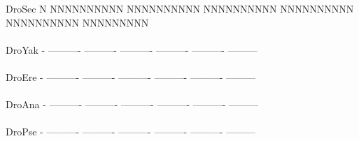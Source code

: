 \documentclass[11pt,twoside,reqno,a4paper]{article}
\begin{document}
{DroSec	N	NNNNNNNNNN	NNNNNNNNNN	NNNNNNNNNN	NNNNNNNNNN	NNNNNNNNNN	NNNNNNNNN\\
\hspace*{7\charwidth}\hspace*{1\charwidth}\hspace*{1\charwidth}\hspace*{1\charwidth}\hspace*{1\charwidth}\hspace*{1\charwidth}\hspace*{1\charwidth}\\
DroYak	-	----------	----------	----------	----------	----------	---------\\
\hspace*{7\charwidth}\hspace*{1\charwidth}\hspace*{1\charwidth}\hspace*{1\charwidth}\hspace*{1\charwidth}\hspace*{1\charwidth}\hspace*{1\charwidth}\\
DroEre	-	----------	----------	----------	----------	----------	---------\\
\hspace*{7\charwidth}\hspace*{1\charwidth}\hspace*{1\charwidth}\hspace*{1\charwidth}\hspace*{1\charwidth}\hspace*{1\charwidth}\hspace*{1\charwidth}\\
DroAna	-	----------	----------	----------	----------	----------	---------\\
\hspace*{7\charwidth}\hspace*{1\charwidth}\hspace*{1\charwidth}\hspace*{1\charwidth}\hspace*{1\charwidth}\hspace*{1\charwidth}\hspace*{1\charwidth}\\
DroPse	-	----------	----------	----------	----------	----------	---------\\
\hspace*{7\charwidth}\hspace*{1\charwidth}\hspace*{1\charwidth}\hspace*{1\charwidth}\hspace*{1\charwidth}\hspace*{1\charwidth}\hspace*{1\charwidth}\\
}
\end{document}
